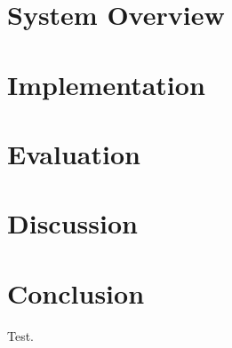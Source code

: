 \documentclass[submit,techrep,english]{ipsj}
\begin{document}
\section{System Overview}

\section{Implementation}

\section{Evaluation}

\section{Discussion}

\section{Conclusion}

\begin{acknowledgment}
    Test.
\end{acknowledgment}




\appendix
\end{document}
